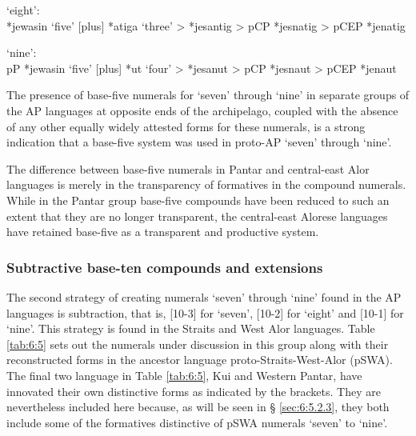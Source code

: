 \ex  `eight':\\   
*jewasin `five' [plus] *atiga `three' {\textgreater} *je{\textprimstress}santig {\textgreater} pCP *jesnatig {\textgreater} pCEP *jenatig 

\ex  `nine': \\
pP *jewasin `five' [plus] *ut `four' {\textgreater} *je{\textprimstress}sanut  {\textgreater} pCP *jesnaut {\textgreater} pCEP *jenaut 
\z
\z

The presence of base-five numerals for `seven' through `nine' in separate groups of the AP languages at opposite ends of the archipelago, coupled with the absence of any other equally widely attested forms for these numerals, is a strong indication that a base-five system was used in proto-AP `seven' through `nine'. 

The difference between base-five numerals in Pantar and central-east Alor languages is merely in the transparency of formatives in the compound numerals. While in the Pantar group base-five compounds have been reduced to such an extent that they are no longer transparent, the central-east Alorese languages have retained base-five as a transparent and productive system. 

\subsubsection{Subtractive base-ten compounds and extensions}\label{sec:6:5.2.2}
The second strategy of creating numerals `seven' through `nine' found in the AP languages is subtraction, that is, [10-3] for `seven', [10-2] for `eight' and  [10-1] for `nine'. This strategy is found in the Straits and West Alor languages. Table \ref{tab:6:5} sets out the numerals under discussion in this group along with their reconstructed forms in the ancestor language proto-Straits-West-Alor (pSWA). The final two language in Table \ref{tab:6:5}, Kui and Western Pantar, have innovated their own distinctive forms as indicated by the brackets. They are nevertheless included here because, as will be seen in {\S} \ref{sec:6:5.2.3}, they both include some of the formatives distinctive of pSWA numerals `seven' to `nine'.



